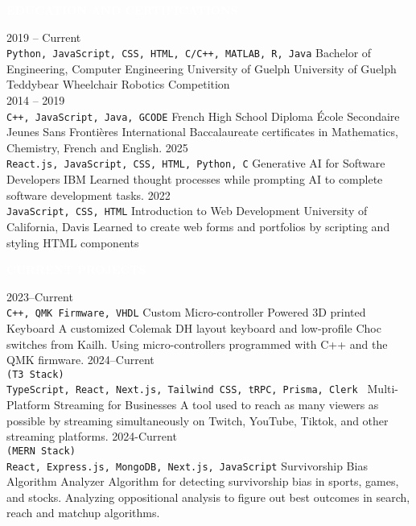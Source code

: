 \documentclass[9pt]{src/developercv} %
\begin{document}
\colorbox{sky800}{\textcolor{white}{\LARGE\MakeUppercase{\textbf{Education and Certifications}}}}\\%
\begin{entrylist}
	\entry
		{2019 -- Current\\
		\small{\texttt{Python, JavaScript, CSS, HTML, C/C++, MATLAB, R, Java}}\hfill}
		{Bachelor of Engineering, Computer Engineering}
		{University of Guelph}
		{University of Guelph Teddybear Wheelchair Robotics Competition\hfill\\}
	\entry
		{2014 -- 2019\\
		\small{\texttt{C++, JavaScript, Java, GCODE}}\hfill}
		{French High School Diploma}
		{École Secondaire Jeunes Sans Frontières}
		{International Baccalaureate certificates in Mathematics, Chemistry, French and English.}
	\entry
		{2025\\
		\small{\texttt{React.js, JavaScript, CSS, HTML, Python, C}}\hfill}
		{Generative AI for Software Developers}
		{IBM}
		{Learned thought processes while prompting AI to complete software development tasks.}
	\entry
		{2022\\
		\small{\texttt{JavaScript, CSS, HTML}}\hfill}
		{Introduction to Web Development}
		{University of California, Davis}
		{Learned to create web forms and portfolios by scripting and styling HTML components}
\end{entrylist}

\colorbox{sky700}{\textcolor{white}{\LARGE\MakeUppercase{\textbf{Current Projects}}}}\\%
\begin{entrylist}
	\entry
		{2023--Current\\
		\small{\texttt{C++, QMK Firmware, VHDL}}}
		{Custom Micro-controller Powered 3D printed Keyboard}
		{}
		{A customized Colemak DH layout keyboard and low-profile Choc switches from Kailh. Using micro-controllers programmed with C++ and the QMK firmware.}
	\entry
		{2024--Current\\
		\small{\texttt{(T3 Stack)\\TypeScript, React, Next.js, Tailwind CSS, tRPC, Prisma, Clerk }}}
		{Multi-Platform Streaming for Businesses}
		{}
		{A tool used to reach as many viewers as possible by streaming simultaneously on Twitch, YouTube, Tiktok, and other streaming platforms.}
	\entry
		{2024-Current\\
		\small{\texttt{(MERN Stack)\\React, Express.js, MongoDB, Next.js, JavaScript}}}
		{Survivorship Bias Algorithm Analyzer}
		{}
		{Algorithm for detecting survivorship bias in sports, games, and stocks. Analyzing oppositional analysis to figure out best outcomes in search, reach and matchup algorithms.}
\end{entrylist}
\end{document}
